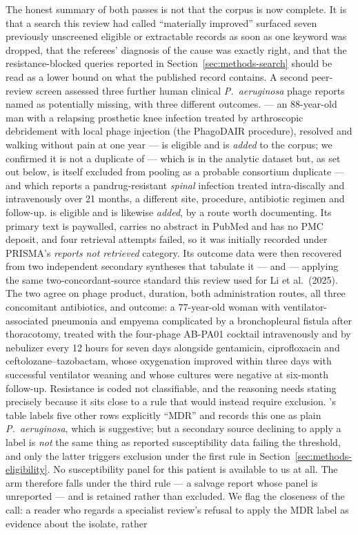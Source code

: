 The honest summary of both passes is not that the corpus is now complete. It is that a search this review had called ``materially improved'' surfaced seven previously unscreened eligible or extractable records as soon as one keyword was dropped, that the referees' diagnosis of the cause was exactly right, and that the resistance-blocked queries reported in Section~\ref{sec:methods-search} should be read as a lower bound on what the published record contains. A second peer-review screen assessed three further human clinical \textit{P.\ aeruginosa} phage reports named as potentially missing, with three different outcomes. \textcite{Ferry2021_frontmed} --- an 88-year-old man with a relapsing prosthetic knee infection treated by arthroscopic debridement with local phage injection (the PhagoDAIR procedure), resolved and walking without pain at one year --- is eligible and is \emph{added} to the corpus; we confirmed it is not a duplicate of \textcite{Ferry2022_natcomms} --- which is in the analytic dataset but, as set out below, is itself excluded from pooling as a probable consortium duplicate --- and which reports a pandrug-resistant \emph{spinal} infection treated intra-discally and intravenously over 21 months, a different site, procedure, antibiotic regimen and follow-up. \textcite{Maddocks2019_ajrccm} is eligible and is likewise \emph{added}, by a route worth documenting. Its primary text is paywalled, carries no abstract in PubMed and has no PMC deposit, and four retrieval attempts failed, so it was initially recorded under PRISMA's \emph{reports not retrieved} category. Its outcome data were then recovered from two independent secondary syntheses that tabulate it --- \textcite{Vaezi2024_errev} and \textcite{Mitropoulou2022_errev} --- applying the same two-concordant-source standard this review used for Li et al.\ (2025). The two agree on phage product, duration, both administration routes, all three concomitant antibiotics, and outcome: a 77-year-old woman with ventilator-associated pneumonia and empyema complicated by a bronchopleural fistula after thoracotomy, treated with the four-phage AB-PA01 cocktail intravenously and by nebulizer every 12 hours for seven days alongside gentamicin, ciprofloxacin and ceftolozane--tazobactam, whose oxygenation improved within three days with successful ventilator weaning and whose cultures were negative at six-month follow-up. Resistance is coded not classifiable, and the reasoning needs stating precisely because it sits close to a rule that would instead require exclusion. \citeauthor{Vaezi2024_errev}'s table labels five other rows explicitly ``MDR'' and records this one as plain \textit{P.\ aeruginosa}, which is suggestive; but a secondary source declining to apply a label is \emph{not} the same thing as reported susceptibility data failing the \textcite{Magiorakos2012_mdrxdr} threshold, and only the latter triggers exclusion under the first rule in Section~\ref{sec:methods-eligibility}. No susceptibility panel for this patient is available to us at all. The arm therefore falls under the third rule --- a salvage report whose panel is unreported --- and is retained rather than excluded. We flag the closeness of the call: a reader who regards a specialist review's refusal to apply the MDR label as evidence about the isolate, rather 